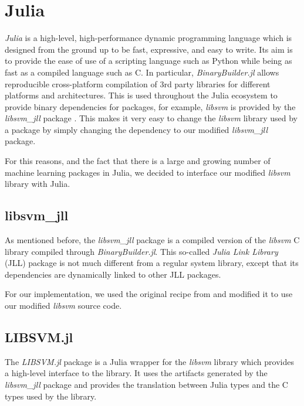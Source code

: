 \section{Julia}%
\label{sub:impl_julia}

\emph{Julia} \cite{bezanson2017julia} is a high-level, high-performance dynamic programming language
which is designed from the ground up to be fast, expressive, and easy to write. Its aim is to provide
the ease of use of a scripting language such as Python while being as fast as a compiled language
such as C. In particular, \emph{BinaryBuilder.jl} \cite{JLLPackagesBinaryBuilder} allows reproducible
cross-platform compilation of 3rd party libraries for different platforms and architectures.
This is used throughout the Julia ecosystem to provide binary dependencies for packages,
for example, \emph{libsvm} is provided by the \emph{libsvm\_jll} package \cite{LibsvmJllJl2022}.
This makes it very easy to change the \emph{libsvm} library used by a package by simply changing
the dependency to our modified \emph{libsvm\_jll} package.

For this reasons, and the fact that there is a large and growing number of machine learning
packages in Julia, we decided to interface our modified \emph{libsvm} library with Julia.

\subsection{libsvm\_jll}

As mentioned before, the \emph{libsvm\_jll} package is a compiled version of the \emph{libsvm} C library
compiled through \emph{BinaryBuilder.jl}. This so-called \emph{Julia Link Library} (JLL) package
is not much different from a regular system library, except that its dependencies are dynamically
linked to other JLL packages.

For our implementation, we used the original recipe from \textcite{LibsvmJllJl2022} and modified it
to use our modified \emph{libsvm} source code.

\subsection{LIBSVM.jl}

The \emph{LIBSVM.jl} package \cite{LIBSVMJl2023} is a Julia wrapper for the \emph{libsvm} library which
provides a high-level interface to the library. It uses the artifacts generated by the \emph{libsvm\_jll}
package and provides the translation between Julia types and the C types used by the library.

